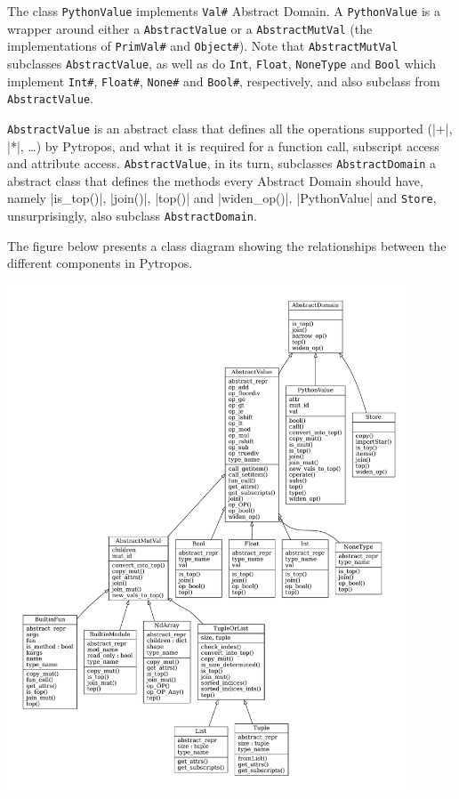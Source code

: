 The class \texttt{PythonValue} implements \texttt{Val\#} Abstract
Domain. A \texttt{PythonValue} is a wrapper around either a
\texttt{AbstractValue} or a \texttt{AbstractMutVal} (the implementations
of \texttt{PrimVal\#} and \texttt{Object\#}). Note that
\texttt{AbstractMutVal} subclasses \texttt{AbstractValue}, as well as do
\texttt{Int}, \texttt{Float}, \texttt{NoneType} and \texttt{Bool} which
implement \texttt{Int\#}, \texttt{Float\#}, \texttt{None\#} and
\texttt{Bool\#}, respectively, and also subclass from
\texttt{AbstractValue}.

\texttt{AbstractValue} is an abstract class that defines all the
operations supported (\pycode|+|, \pycode|*|, \ldots{}) by Pytropos, and
what it is required for a function call, subscript access and attribute
access. \texttt{AbstractValue}, in its turn, subclasses
\texttt{AbstractDomain} a abstract class that defines the methods every
Abstract Domain should have, namely \pycode|is_top()|, \pycode|join()|,
\pycode|top()| and \pycode|widen_op()|. \pycode|PythonValue| and
\texttt{Store}, unsurprisingly, also subclass \texttt{AbstractDomain}.

The figure below presents a class diagram showing the relationships
between the different components in Pytropos.

\includegraphics[width=0.9\textwidth,height=\textheight]{figures/classes_Pytropos-small.pdf}
{}

